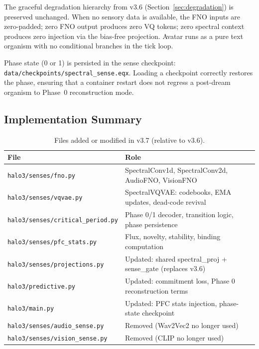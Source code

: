 The graceful degradation hierarchy from v3.6 (Section~\ref{sec:degradation}) is
preserved unchanged.
When no sensory data is available, the FNO inputs are zero-padded; zero FNO output
produces zero VQ tokens; zero spectral context produces zero injection via the
bias-free projection.
Avatar runs as a pure text organism with no conditional branches in the tick loop.

Phase state (0 or 1) is persisted in the sense checkpoint:
\texttt{data/checkpoints/spectral\_sense.eqx}.
Loading a checkpoint correctly restores the phase, ensuring that a container restart
does not regress a post-dream organism to Phase~0 reconstruction mode.

\subsection{Implementation Summary}
\label{sec:v37_impl}

\begin{table}[h]
\centering
\caption{Files added or modified in v3.7 (relative to v3.6).}
\label{tab:v37_files}
\small
\begin{tabularx}{\columnwidth}{lX}
\toprule
\textbf{File} & \textbf{Role} \\
\midrule
\texttt{halo3/senses/fno.py}            & SpectralConv1d, SpectralConv2d, AudioFNO, VisionFNO \\
\texttt{halo3/senses/vqvae.py}          & SpectralVQVAE: codebooks, EMA updates, dead-code revival \\
\texttt{halo3/senses/critical\_period.py} & Phase 0/1 decoder, transition logic, phase persistence \\
\texttt{halo3/senses/pfc\_stats.py}     & Flux, novelty, stability, binding computation \\
\texttt{halo3/senses/projections.py}    & Updated: shared spectral\_proj + sense\_gate (replaces v3.6) \\
\texttt{halo3/predictive.py}            & Updated: commitment loss, Phase 0 reconstruction terms \\
\texttt{halo3/main.py}                  & Updated: PFC stats injection, phase-state checkpoint \\
\texttt{halo3/senses/audio\_sense.py}   & Removed (Wav2Vec2 no longer used) \\
\texttt{halo3/senses/vision\_sense.py}  & Removed (CLIP no longer used) \\
\bottomrule
\end{tabularx}
\end{table}

